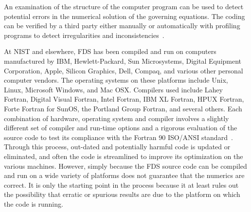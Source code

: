 \documentclass[11pt]{book}
\begin{document}
An examination of the structure of the computer program can be used to detect potential errors in the numerical solution of the governing equations.
The coding can be verified by a third party either manually or automatically with profiling programs to detect irregularities and
inconsistencies~\cite{ASTM:E1355}.

At NIST and elsewhere, FDS has been compiled and run on computers manufactured by IBM, Hewlett-Packard, Sun Microsystems, Digital Equipment
Corporation, Apple, Silicon Graphics, Dell, Compaq, and various other personal computer vendors. The operating systems on these platforms include
Unix, Linux, Microsoft Windows, and Mac OSX. Compilers used include Lahey Fortran, Digital Visual Fortran, Intel Fortran, IBM XL Fortran, HPUX
Fortran, Forte Fortran for SunOS, the Portland Group Fortran, and several others. Each combination of hardware, operating system and compiler
involves a slightly different set of compiler and run-time options and a rigorous evaluation of the source code to test its compliance with the
Fortran 90 ISO/ANSI standard~\cite{F90}. Through this process, out-dated and potentially harmful code is updated or eliminated, and often the code is
streamlined to improve its optimization on the various machines. However, simply because the FDS source code can be compiled and run on a wide
variety of platforms does not guarantee that the numerics are correct. It is only the starting point in the process because it at least rules out the
possibility that erratic or spurious results are due to the platform on which the code is running.
\end{document}
